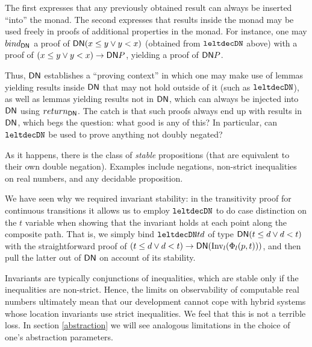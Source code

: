 \documentclass[runningheads]{llncs}
\newcommand{\DN}{{\sf DN}}
\newcommand{\State}{{\rm State}}
\newcommand{\Inv}{{\rm Inv}}
\newcommand{\Unsafe}{{\rm Unsafe}}
\newcommand{\Reach}{{\rm Reach}}
\newcommand{\leltdecDN}{{\tt leltdecDN}}
\begin{document}
The first expresses that any previously obtained result can always be
inserted ``into'' the monad. The second expresses that results inside
the monad may be used freely in proofs of additional properties in the
monad. For instance, one may $bind_{\DN}$ a proof of $\DN (x \leq y \vee y < x)$ 
(obtained from $\leltdecDN$ above) with a proof of $(x \leq y \vee y < x) \rightarrow \DN P$, yielding a proof of $\DN P$.
 
Thus, $\DN$ establishes a ``proving context'' in which one may make
use of lemmas yielding results inside $\DN$ that may not hold outside
of it (such as $\leltdecDN$), as well as lemmas yielding results
not in $\DN$, which can always be injected into $\DN$ using
$return_{\DN}$. The catch is that such proofs always end up with results
in $\DN$, which begs the question: what good is any of this? In
particular, can $\leltdecDN$ be used to prove anything not doubly
negated?
 
As it happens, there is the class of \emph{stable} propositions (that
are equivalent to their own double negation). Examples include
negations, non-strict inequalities on real numbers, and any decidable
proposition.
 
We have seen why we required invariant stability:
in the transitivity proof for continuous transitions
it allows
us to employ $\leltdecDN$ to do case distinction on the $t$ variable
when showing that the invariant holds at each point along the
composite path. That is, we simply bind $\leltdecDN t d$ of type
$\DN (t \leq d \vee d < t)$ with the straightforward proof of $(t \leq d
\vee d < t) \rightarrow \DN (\Inv_l(\Phi_l (p, t)))$, and
then pull the latter out of $\DN$ on account of its stability.
 
Invariants are typically conjunctions of inequalities, which are
stable only if the inequalities are non-strict. Hence, the limits on
observability of computable real numbers ultimately mean that our
development cannot cope with hybrid systems whose location invariants
use strict inequalities. We feel that this is not a terrible loss. In
section \ref{abstraction} we will see analogous limitations in the
choice of one's abstraction parameters.
 
\end{document}
